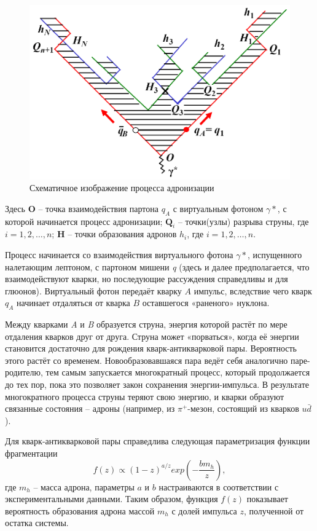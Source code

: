 \documentclass{extreport}
\begin{document}
\begin{figure}[h]
    \centering
    \includegraphics[width = 0.8\linewidth]{fragmentation.png}
    \caption{Схематичное изображение процесса адронизации \cite{LUND}}
    \label{fig:hadronization}
\end{figure} 

Здесь \textbf{O} – точка взаимодействия партона $q_A$ с виртуальным фотоном $\gamma*$, с которой начинается процесс адронизации; $\textbf{Q}_i$ – точки(узлы) разрыва струны, где $i = 1, 2, \dots, n$; \textbf{H} -- точки образования адронов $h_i$, где $i = 1, 2, \dots, n$.

Процесс начинается со взаимодействия виртуального фотона $\gamma*$, испущенного налетающим лептоном, с партоном мишени \textit{q} (здесь и далее предполагается, что взаимодействуют кварки, но последующие рассуждения справедливы и для глюонов). Виртуальный фотон передаёт кварку $A$ импульс, вследствие чего кварк $q_A$ начинает отдаляться от кварка $B$ оставшегося «раненого» нуклона. 

Между кварками \textit{A} и \textit{B} образуется струна, энергия которой растёт по мере отдаления кварков друг от друга. Струна может «порваться», когда её энергии становится достаточно для рождения кварк-антикварковой пары. Вероятность этого растёт со временем. Новообразовавшаяся пара ведёт себя аналогично паре-родителю, тем самым запускается многократный процесс, который продолжается до тех пор, пока это позволяет закон сохранения энергии-импульса. В результате многократного процесса струны теряют свою энергию, и кварки образуют связанные состояния – адроны (например, из $\pi^{+}$-мезон, состоящий из кварков $u\bar{d}$ ). 

Для кварк-антикварковой пары справедлива следующая параметризация функции фрагментации
\begin{equation}
	f(z) \propto (1-z)^{a/z} exp(- \frac{b m_h}{z}),
\end{equation}
где $m_h$ – масса адрона, параметры $a$ и $b$ настраиваются в соответствии с экспериментальными данными. Таким образом, функция $f(z)$ показывает вероятность образования адрона массой $m_h$ с долей импульса $z$, полученной от остатка системы.
\end{document}
